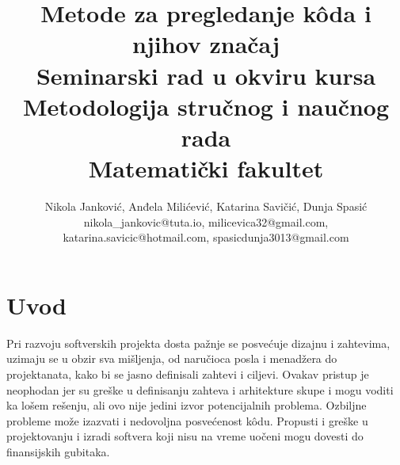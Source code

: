 \documentclass[a4paper]{article}
\begin{document}
\title{Metode za pregledanje kôda i njihov značaj\\ \small{Seminarski rad u okviru kursa\\Metodologija stručnog i naučnog rada\\ Matematički fakultet}}

\author{Nikola Janković, Anđela Milićević, Katarina Savičić, Dunja Spasić\\ 
nikola\_jankovic@tuta.io, milicevica32@gmail.com, \\
katarina.savicic@hotmail.com, spasicdunja3013@gmail.com}


\maketitle


\tableofcontents

\newpage

\section{Uvod}
\label{sec:uvod}

Pri razvoju softverskih projekta dosta pažnje se posvećuje dizajnu i zahtevima, uzimaju se u obzir sva mišljenja, od naručioca posla i menadžera do projektanata, kako bi se jasno definisali zahtevi i ciljevi. Ovakav pristup je neophodan jer su greške u definisanju zahteva i arhitekture skupe i mogu voditi ka lošem rešenju, ali ovo nije jedini izvor potencijalnih problema. Ozbiljne probleme može izazvati i nedovoljna posvećenost kôdu. Propusti i greške u projektovanju i izradi softvera koji nisu na vreme uočeni mogu dovesti do finansijskih gubitaka.
\end{document}
